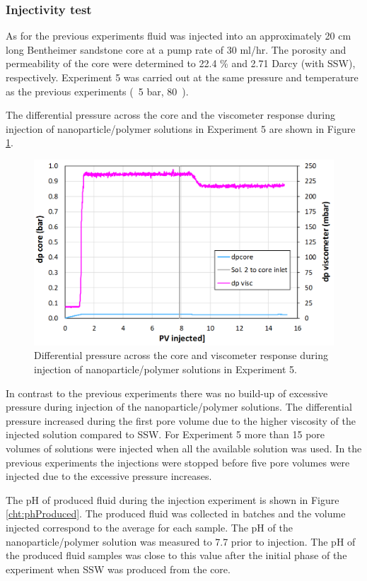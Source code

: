 \subsubsection{Injectivity test}
As for the previous experiments fluid was injected into an approximately 20 cm long Bentheimer sandstone core at a pump rate of 30 ml/hr. The porosity and permeability of the core were determined to 22.4 \% and 2.71 Darcy (with SSW), respectively. Experiment 5 was carried out at the same pressure and temperature as the previous experiments (~5 bar, 80~\celsius). 

The differential pressure across the core and the viscometer response during injection of nanoparticle/polymer solutions in Experiment 5 are shown in Figure \ref{cht:gelexp5_1}.

\begin{figure}[h!]
    \centering
    \includegraphics[width=\textwidth]{img/cht/gelexp5_1.png}
    \caption{Differential pressure across the core and viscometer response during injection of nanoparticle/polymer solutions in Experiment 5.}
    \label{cht:gelexp5_1} %
\end{figure}

In contrast to the previous experiments there was no build-up of excessive pressure during injection of the nanoparticle/polymer solutions. The differential pressure increased during the first pore volume due to the higher viscosity of the injected solution compared to SSW. For Experiment 5 more than 15 pore volumes of solutions were injected when all the available solution was used. In the previous experiments the injections were stopped before five pore volumes were injected due to the excessive pressure increases.

The pH of produced fluid during the injection experiment is shown in Figure \ref{cht:phProduced}. The produced fluid was collected in batches and the volume injected correspond to the average for each sample. The pH of the nanoparticle/polymer solution was measured to 7.7 prior to injection. The pH of the produced fluid samples was close to this value after the initial phase of the experiment when SSW was produced from the core.

